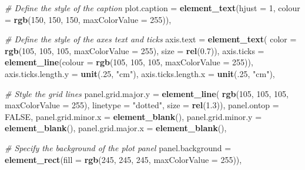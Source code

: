\documentclass[]{article}
\newenvironment{Shaded}{\begin{snugshade}}{\end{snugshade}}
\newcommand{\CommentTok}[1]{\textcolor[rgb]{0.56,0.35,0.01}{\textit{#1}}}
\newcommand{\DataTypeTok}[1]{\textcolor[rgb]{0.13,0.29,0.53}{#1}}
\newcommand{\DecValTok}[1]{\textcolor[rgb]{0.00,0.00,0.81}{#1}}
\newcommand{\FloatTok}[1]{\textcolor[rgb]{0.00,0.00,0.81}{#1}}
\newcommand{\KeywordTok}[1]{\textcolor[rgb]{0.13,0.29,0.53}{\textbf{#1}}}
\newcommand{\NormalTok}[1]{#1}
\newcommand{\OtherTok}[1]{\textcolor[rgb]{0.56,0.35,0.01}{#1}}
\newcommand{\StringTok}[1]{\textcolor[rgb]{0.31,0.60,0.02}{#1}}
\begin{document}
\begin{Shaded}
\begin{Highlighting}[]
    \CommentTok{# Define the style of the caption}
    \DataTypeTok{plot.caption =} \KeywordTok{element_text}\NormalTok{(}\DataTypeTok{hjust =} \DecValTok{1}\NormalTok{, }
                                \DataTypeTok{colour =} \KeywordTok{rgb}\NormalTok{(}\DecValTok{150}\NormalTok{, }\DecValTok{150}\NormalTok{, }\DecValTok{150}\NormalTok{, }\DataTypeTok{maxColorValue =} \DecValTok{255}\NormalTok{)),}
    
    \CommentTok{# Define the style of the axes text and ticks}
    \DataTypeTok{axis.text =} \KeywordTok{element_text}\NormalTok{(}
      \DataTypeTok{color =} \KeywordTok{rgb}\NormalTok{(}\DecValTok{105}\NormalTok{, }\DecValTok{105}\NormalTok{, }\DecValTok{105}\NormalTok{, }\DataTypeTok{maxColorValue =} \DecValTok{255}\NormalTok{), }\DataTypeTok{size =} \KeywordTok{rel}\NormalTok{(}\FloatTok{0.7}\NormalTok{)),}
    \DataTypeTok{axis.ticks =} \KeywordTok{element_line}\NormalTok{(}\DataTypeTok{colour =} \KeywordTok{rgb}\NormalTok{(}\DecValTok{105}\NormalTok{, }\DecValTok{105}\NormalTok{, }\DecValTok{105}\NormalTok{, }\DataTypeTok{maxColorValue =} \DecValTok{255}\NormalTok{)),}
    \DataTypeTok{axis.ticks.length.y =} \KeywordTok{unit}\NormalTok{(.}\DecValTok{25}\NormalTok{, }\StringTok{"cm"}\NormalTok{),}
    \DataTypeTok{axis.ticks.length.x =} \KeywordTok{unit}\NormalTok{(.}\DecValTok{25}\NormalTok{, }\StringTok{"cm"}\NormalTok{),}
    
    \CommentTok{# Style the grid lines}
    \DataTypeTok{panel.grid.major.y =} \KeywordTok{element_line}\NormalTok{(}
      \KeywordTok{rgb}\NormalTok{(}\DecValTok{105}\NormalTok{, }\DecValTok{105}\NormalTok{, }\DecValTok{105}\NormalTok{, }\DataTypeTok{maxColorValue =} \DecValTok{255}\NormalTok{), }\DataTypeTok{linetype =} \StringTok{"dotted"}\NormalTok{, }\DataTypeTok{size =} \KeywordTok{rel}\NormalTok{(}\FloatTok{1.3}\NormalTok{)),}
    \DataTypeTok{panel.ontop =} \OtherTok{FALSE}\NormalTok{,}
    \DataTypeTok{panel.grid.minor.x =} \KeywordTok{element_blank}\NormalTok{(),}
    \DataTypeTok{panel.grid.minor.y =} \KeywordTok{element_blank}\NormalTok{(),}
    \DataTypeTok{panel.grid.major.x =} \KeywordTok{element_blank}\NormalTok{(),}
    
    \CommentTok{# Specify the background of the plot panel}
    \DataTypeTok{panel.background =} \KeywordTok{element_rect}\NormalTok{(}\DataTypeTok{fill =} \KeywordTok{rgb}\NormalTok{(}\DecValTok{245}\NormalTok{, }\DecValTok{245}\NormalTok{, }\DecValTok{245}\NormalTok{, }\DataTypeTok{maxColorValue =} \DecValTok{255}\NormalTok{)),}
    

\end{Highlighting}
\end{Shaded}
\end{document}
